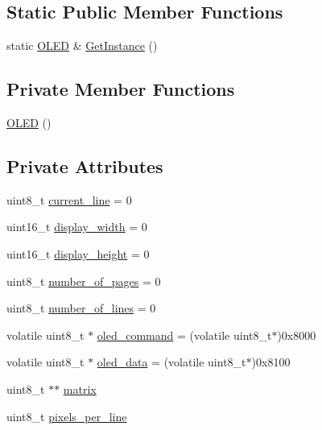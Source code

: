 \subsection*{Static Public Member Functions}
\begin{DoxyCompactItemize}
\item 
static \hyperlink{class_o_l_e_d}{O\+L\+ED} \& \hyperlink{class_o_l_e_d_a7b261492679b5e67d346e97ed575332e}{Get\+Instance} ()
\end{DoxyCompactItemize}
\subsection*{Private Member Functions}
\begin{DoxyCompactItemize}
\item 
\hyperlink{class_o_l_e_d_a8eabf371b5642d99800adb759dab27fd}{O\+L\+ED} ()
\end{DoxyCompactItemize}
\subsection*{Private Attributes}
\begin{DoxyCompactItemize}
\item 
uint8\+\_\+t \hyperlink{class_o_l_e_d_aebd62601be5e2ceef6295721f17fc013}{current\+\_\+line} = 0
\item 
uint16\+\_\+t \hyperlink{class_o_l_e_d_ae88ab3d6d63a7ead982a3b7cc673eefe}{display\+\_\+width} = 0
\item 
uint16\+\_\+t \hyperlink{class_o_l_e_d_aa14ebb59666d7822288115a04ac0a34b}{display\+\_\+height} = 0
\item 
uint8\+\_\+t \hyperlink{class_o_l_e_d_aaac99b0eb4e9dfe92b8571488dc89288}{number\+\_\+of\+\_\+pages} = 0
\item 
uint8\+\_\+t \hyperlink{class_o_l_e_d_a9ea1c55112deede1a61142af276a6bc9}{number\+\_\+of\+\_\+lines} = 0
\item 
volatile uint8\+\_\+t $\ast$ \hyperlink{class_o_l_e_d_af0a85ccd0274347b8c1ac77d298a14cf}{oled\+\_\+command} = (volatile uint8\+\_\+t$\ast$)0x8000
\item 
volatile uint8\+\_\+t $\ast$ \hyperlink{class_o_l_e_d_a1bc54d49808f92ddfc354511b692df6f}{oled\+\_\+data} = (volatile uint8\+\_\+t$\ast$)0x8100
\item 
uint8\+\_\+t $\ast$$\ast$ \hyperlink{class_o_l_e_d_a9d32e21189940afba24deab0a2bc0126}{matrix}
\item 
uint8\+\_\+t \hyperlink{class_o_l_e_d_a6ddac7b826eccac8c682c5246ef52b29}{pixels\+\_\+per\+\_\+line}
\end{DoxyCompactItemize}


